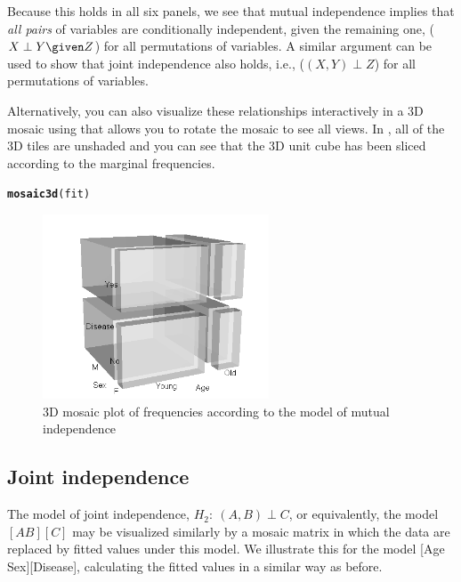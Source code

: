 \documentclass[11pt]{book}\usepackage[]{graphicx}\usepackage[]{color}
\makeatletter
\newcommand{\hlstd}[1]{\textcolor[rgb]{0.345,0.345,0.345}{#1}}%
\newcommand{\hlkwd}[1]{\textcolor[rgb]{0.737,0.353,0.396}{\textbf{#1}}}%
\newenvironment{kframe}{%
 \def\at@end@of@kframe{}%
 \ifinner\ifhmode%
  \def\at@end@of@kframe{\end{minipage}}%
  \begin{minipage}{\columnwidth}%
 \fi\fi%
 \def\FrameCommand##1{\hskip\@totalleftmargin \hskip-\fboxsep
 \colorbox{shadecolor}{##1}\hskip-\fboxsep
     \hskip-\linewidth \hskip-\@totalleftmargin \hskip\columnwidth}%
 \MakeFramed {\advance\hsize-\width
   \@totalleftmargin\z@ \linewidth\hsize
   \@setminipage}}%
 {\par\unskip\endMakeFramed%
 \at@end@of@kframe}
\newenvironment{knitrout}{}{} %
\renewenvironment{knitrout}{\small\renewcommand{\baselinestretch}{.85}}{} %
\makeatother
\begin{document}
Because this holds in all six panels, we see that mutual independence
implies that \emph{all pairs} of variables are conditionally
independent, given the remaining one,  ($X \perp Y \given Z$) for all
permutations of variables.  A similar argument can be used to
show that joint independence also holds, i.e., ($(X,Y) \perp Z$) for all
permutations of variables.

Alternatively, you can also visualize these relationships interactively
in a 3D mosaic using 
that allows you to rotate the mosaic to see all views.  In ,
all of the 3D tiles are unshaded and you can see that the 3D unit cube has been
sliced according to the marginal frequencies.

\begin{knitrout}
\color{fgcolor}\begin{kframe}
\begin{alltt}
\hlkwd{mosaic3d}\hlstd{(fit)}
\end{alltt}
\end{kframe}
\end{knitrout}


\begin{figure}[!htb]
 \centering
 \includegraphics[width=0.6\textwidth]{ch05/fig/struct-mos3d1.png}
 \caption{3D mosaic plot of frequencies according to the model of mutual independence}\label{fig:struct-mos3d1}
\end{figure}


\subsection{Joint independence}
The model of joint independence, $H_2: \: (A, B) \perp C$, or
equivalently, the \loglin model $[A B][C]$
may be visualized similarly
by a mosaic matrix
in which the data are replaced by fitted values under this model.
We illustrate this for the model [Age Sex][Disease],
calculating the fitted values in a similar way as before.
\end{document}
